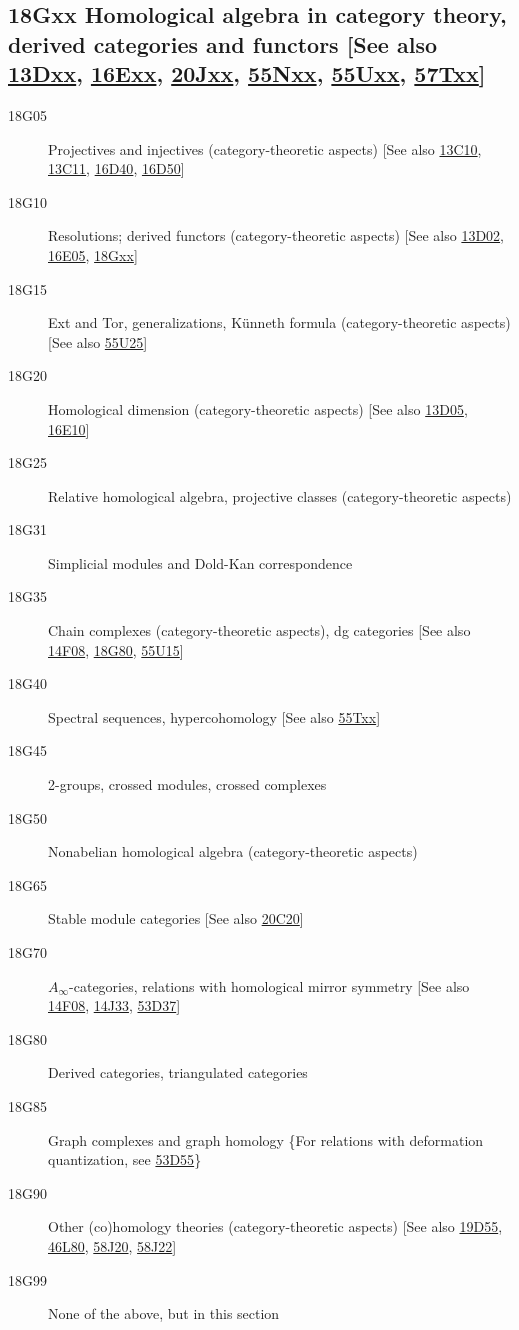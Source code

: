 \subsection*{18Gxx  Homological algebra in category theory, derived categories and functors [See also \hyperref[13Dxx]{13Dxx}, \hyperref[16Exx]{16Exx}, \hyperref[20Jxx]{20Jxx}, \hyperref[55Nxx]{55Nxx}, \hyperref[55Uxx]{55Uxx}, \hyperref[57Txx]{57Txx}] }\label{18Gxx}
\begin{description}
\item [18G05]\label{18G05} Projectives and injectives (category-theoretic aspects) [See also \hyperref[13C10]{13C10}, \hyperref[13C11]{13C11}, \hyperref[16D40]{16D40}, \hyperref[16D50]{16D50}]
\item [18G10]\label{18G10} Resolutions; derived functors (category-theoretic aspects) [See also \hyperref[13D02]{13D02}, \hyperref[16E05]{16E05}, \hyperref[18Gxx]{18Gxx}]
\item [18G15]\label{18G15} Ext and Tor, generalizations, K\"{u}nneth formula (category-theoretic aspects) [See also \hyperref[55U25]{55U25}]
\item [18G20]\label{18G20} Homological dimension (category-theoretic aspects) [See also \hyperref[13D05]{13D05}, \hyperref[16E10]{16E10}]
\item [18G25]\label{18G25} Relative homological algebra, projective classes (category-theoretic aspects)
\item [18G31]\label{18G31} Simplicial modules and Dold-Kan correspondence
\item [18G35]\label{18G35} Chain complexes (category-theoretic aspects), dg categories [See also \hyperref[14F08]{14F08}, \hyperref[18G80]{18G80}, \hyperref[55U15]{55U15}]
\item [18G40]\label{18G40} Spectral sequences, hypercohomology [See also \hyperref[55Txx]{55Txx}]
\item [18G45]\label{18G45} 2-groups, crossed modules, crossed complexes
\item [18G50]\label{18G50} Nonabelian homological algebra (category-theoretic aspects)
\item [18G65]\label{18G65} Stable module categories [See also \hyperref[20C20]{20C20}]
\item [18G70]\label{18G70} $A_{\infty}$-categories, relations with homological mirror symmetry [See also \hyperref[14F08]{14F08}, \hyperref[14J33]{14J33}, \hyperref[53D37]{53D37}]
\item [18G80]\label{18G80} Derived categories, triangulated categories
\item [18G85]\label{18G85} Graph complexes and graph homology \{For relations with deformation quantization, see \hyperref[53D55]{53D55}\}
\item [18G90]\label{18G90} Other (co)homology theories (category-theoretic aspects) [See also \hyperref[19D55]{19D55}, \hyperref[46L80]{46L80}, \hyperref[58J20]{58J20}, \hyperref[58J22]{58J22}]
\item [18G99]\label{18G99} None of the above, but in this section
\end{description}
